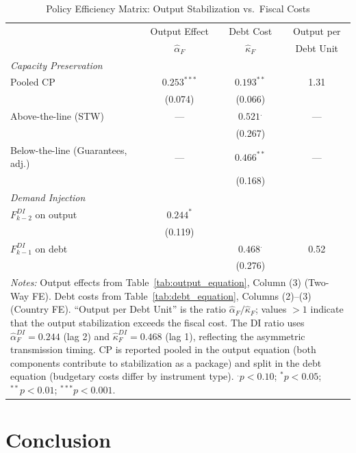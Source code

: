 \documentclass[12pt, a4paper]{article}
\begin{document}
\begin{table}[htbp]
\centering
\caption{Policy Efficiency Matrix: Output Stabilization vs.\ Fiscal Costs}
\label{tab:policy_matrix}
\small
\begin{tabular}{lccc}
\toprule
 & Output Effect & Debt Cost & Output per \\
 & $\hat{\alpha}_F$ & $\hat{\kappa}_F$ & Debt Unit \\
\midrule
\textit{Capacity Preservation} \\[2pt]
\quad Pooled CP
  & $0.253^{***}$ & $0.193^{**}$  & 1.31 \\
  & (0.074)       & (0.066)       &      \\[4pt]
\quad Above-the-line (STW)
  & ---           & $0.521^{.}$   & ---  \\
  &               & (0.267)       &      \\[4pt]
\quad Below-the-line (Guarantees, adj.)
  & ---           & $0.466^{**}$  & ---  \\
  &               & (0.168)       &      \\[6pt]
\textit{Demand Injection} \\[2pt]
\quad $F^{DI}_{k-2}$ on output
  & $0.244^{*}$   &               &      \\
  & (0.119)       &               &      \\[4pt]
\quad $F^{DI}_{k-1}$ on debt
  &               & $0.468^{.}$   & 0.52 \\
  &               & (0.276)       &      \\[6pt]
\midrule
\multicolumn{4}{p{10cm}}{\footnotesize \textit{Notes:} Output effects from Table~\ref{tab:output_equation}, Column (3) (Two-Way FE). Debt costs from Table~\ref{tab:debt_equation}, Columns (2)--(3) (Country FE). ``Output per Debt Unit'' is the ratio $\hat{\alpha}_F / \hat{\kappa}_F$; values $>1$ indicate that the output stabilization exceeds the fiscal cost. The DI ratio uses $\hat{\alpha}^{DI}_F = 0.244$ (lag 2) and $\hat{\kappa}^{DI}_F = 0.468$ (lag 1), reflecting the asymmetric transmission timing. CP is reported pooled in the output equation (both components contribute to stabilization as a package) and split in the debt equation (budgetary costs differ by instrument type). $^{.}p<0.10$; $^{*}p<0.05$; $^{**}p<0.01$; $^{***}p<0.001$.} \\
\end{tabular}
\end{table}

\section{Conclusion}
\label{sec:conclusion}
\end{document}
